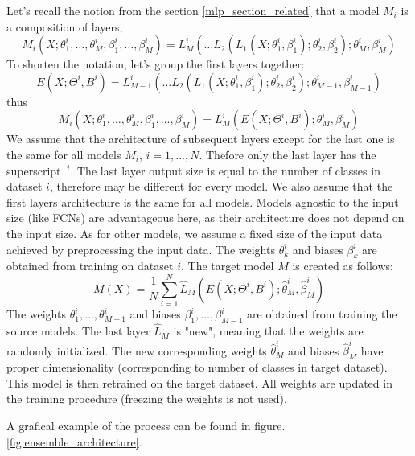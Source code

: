 \documentclass[a4paper,11pt,twoside]{report}
\theoremstyle{definition}
\begin{document}
Let's recall the notion from the section \ref{mlp_section_related} that a model $M_i$ is a composition of layers, $$M_i(X; \theta_1^i,\dots , \theta_M^i, \beta_1^i,\dots , \beta_M^i) = L_M^i(\dots L_2(L_1(X;\theta_1^i, \beta_1^i);\theta_2^i, \beta_2^i);\theta_M^i, \beta_M^i)$$
To shorten the notation, let's group the first layers together:
$$E(X;\Theta^i, B^i) = L_{M-1}^i(\dots L_2(L_1(X;\theta_1^i, \beta_1^i);\theta_2^i, \beta_2^i);\theta_{M-1}^i, \beta_{M-1}^i)$$
thus
$$M_i(X; \theta_1^i,\dots , \theta_M^i, \beta_1^i,\dots , \beta_M^i) =  L_M^i(E(X; \Theta^i, B^i);\theta_M^i, \beta_M^i)$$
We assume that the architecture of subsequent layers except for the last one is the same for all models $M_i$, $i=1, \dots, N$. Thefore only the last layer has the superscript $\ ^i$. The last layer output size is equal to the number of classes in dataset $i$, therefore may be different for every model. We also assume that the first layers architecture is the same for all models. Models agnostic to the input size (like FCNs) are advantageous here, as their architecture does not depend on the input size. As for other models, we assume a fixed size of the input data achieved by preprocessing the input data.
The weights $\theta^i_k$ and biases $\beta^i_k$ are obtained from training on dataset $i$.
The target model $M$ is created as follows:
$$M(X) = \frac{1}{N} \sum_{i=1}^N \hat L_M( E(X; \Theta^i, B^i);\hat\theta_M^i, \hat\beta_M^i )$$
The weights $\theta_1^i, \dots, \theta_{M-1}^i$ and biases $\beta_1^i, \dots, \beta_{M-1}^i$ are obtained from training the source models. The last layer $\hat L_M$ is "new", meaning that the weights are randomly initialized. The new corresponding weights $\hat\theta_M^i$ and biases $\hat\beta_M^i$ have proper dimensionality (corresponding to number of classes in target dataset). This model is then retrained on the target dataset. All weights are updated in the training procedure (freezing the weights is not used).

A grafical example of the process can be found in figure. \ref{fig:ensemble_architecture}.
\end{document}
